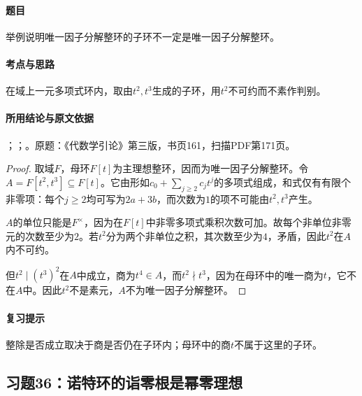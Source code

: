 \paragraph{题目}

举例说明唯一因子分解整环的子环不一定是唯一因子分解整环。

\paragraph{考点与思路}

在域上一元多项式环内，取由$t^2,t^3$生成的子环，用$t^2$不可约而不素作判别。

\paragraph{所用结论与原文依据}

；；。原题：《代数学引论》第三版，书页161，扫描PDF第171页。


\begin{proof}

取域$F$，母环$F[t]$为主理想整环，因而为唯一因子分解整环。令$A=F[t^2,t^3]\subseteq F[t]$。它由形如$c_0+\sum_{j\ge2}c_jt^j$的多项式组成，和式仅有有限个非零项：每个$j\ge2$均可写为$2a+3b$，而次数为$1$的项不可能由$t^2,t^3$产生。

$A$的单位只能是$F^\times$，因为在$F[t]$中非零多项式乘积次数可加。故每个非单位非零元的次数至少为$2$。若$t^2$分为两个非单位之积，其次数至少为$4$，矛盾，因此$t^2$在$A$内不可约。

但$t^2\mid(t^3)^2$在$A$中成立，商为$t^4\in A$，而$t^2\nmid t^3$，因为在母环中的唯一商为$t$，它不在$A$中。因此$t^2$不是素元，$A$不为唯一因子分解整环。

\end{proof}

\paragraph{复习提示}

整除是否成立取决于商是否仍在子环内；母环中的商$t$不属于这里的子环。

\subsection{习题36：诺特环的诣零根是幂零理想}

\label{ex:4:36}

